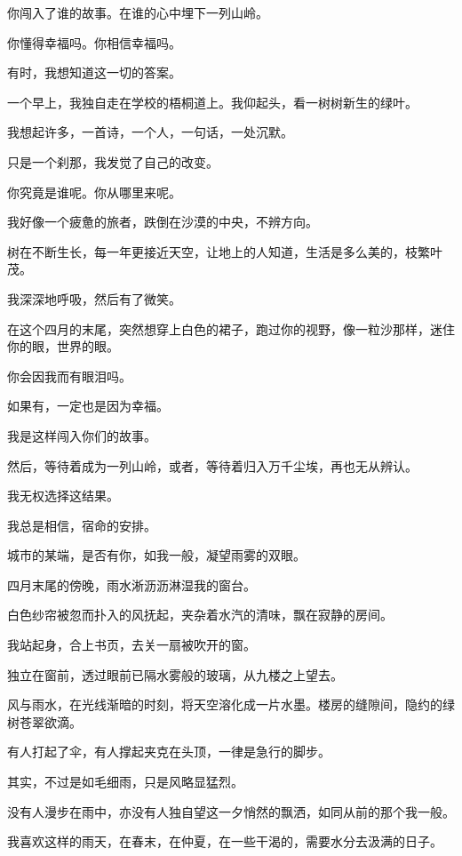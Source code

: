 		你闯入了谁的故事。在谁的心中埋下一列山岭。\par
		你懂得幸福吗。你相信幸福吗。\par
		有时，我想知道这一切的答案。\par
		一个早上，我独自走在学校的梧桐道上。我仰起头，看一树树新生的绿叶。\par
		我想起许多，一首诗，一个人，一句话，一处沉默。\par
		只是一个刹那，我发觉了自己的改变。\par
		你究竟是谁呢。你从哪里来呢。\par
		我好像一个疲惫的旅者，跌倒在沙漠的中央，不辨方向。\par
		树在不断生长，每一年更接近天空，让地上的人知道，生活是多么美的，枝繁叶茂。\par
		我深深地呼吸，然后有了微笑。\par
		在这个四月的末尾，突然想穿上白色的裙子，跑过你的视野，像一粒沙那样，迷住你的眼，世界的眼。\par
		你会因我而有眼泪吗。\par
		如果有，一定也是因为幸福。

		我是这样闯入你们的故事。\par
		然后，等待着成为一列山岭，或者，等待着归入万千尘埃，再也无从辨认。\par
		我无权选择这结果。\par
		我总是相信，宿命的安排。

	\endwriting



		城市的某端，是否有你，如我一般，凝望雨雾的双眼。

		\vspace{1em}
		四月末尾的傍晚，雨水淅沥沥淋湿我的窗台。\par
		白色纱帘被忽而扑入的风抚起，夹杂着水汽的清味，飘在寂静的房间。\par
		我站起身，合上书页，去关一扇被吹开的窗。\par
		独立在窗前，透过眼前已隔水雾般的玻璃，从九楼之上望去。\par
		风与雨水，在光线渐暗的时刻，将天空溶化成一片水墨。楼房的缝隙间，隐约的绿树苍翠欲滴。\par
		有人打起了伞，有人撑起夹克在头顶，一律是急行的脚步。\par
		其实，不过是如毛细雨，只是风略显猛烈。\par
		没有人漫步在雨中，亦没有人独自望这一夕悄然的飘洒，如同从前的那个我一般。

		我喜欢这样的雨天，在春末，在仲夏，在一些干渴的，需要水分去汲满的日子。

